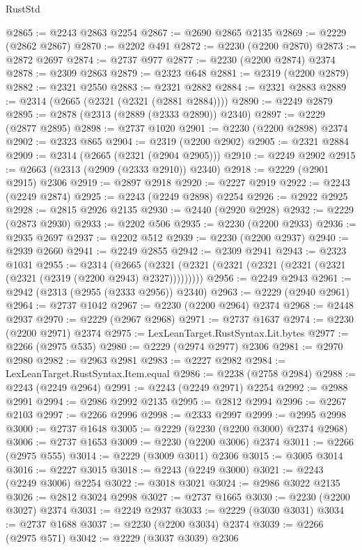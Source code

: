 \begin{lexlean}{RustStd}
\begin{coremodule}
@2865 := @2243 @2863 @2254
@2867 := @2690 @2865 @2135
@2869 := @2229 (@2862 @2867)
@2870 := @2202 @491
@2872 := @2230 (@2200 @2870)
@2873 := @2872 @2697
@2874 := @2737 @977
@2877 := @2230 (@2200 @2874) @2374
@2878 := @2309 @2863
@2879 := @2323 @648
@2881 := @2319 (@2200 @2879)
@2882 := @2321 @2550
@2883 := @2321 @2882
@2884 := @2321 @2883
@2889 := @2314 (@2665 (@2321 (@2321 (@2881 @2884))))
@2890 := @2249 @2879
@2895 := @2878 (@2313 (@2889 (@2333 @2890)) @2340)
@2897 := @2229 (@2877 @2895)
@2898 := @2737 @1020
@2901 := @2230 (@2200 @2898) @2374
@2902 := @2323 @865
@2904 := @2319 (@2200 @2902)
@2905 := @2321 @2884
@2909 := @2314 (@2665 (@2321 (@2904 @2905)))
@2910 := @2249 @2902
@2915 := @2663 (@2313 (@2909 (@2333 @2910)) @2340)
@2918 := @2229 (@2901 @2915) @2306
@2919 := @2897 @2918
@2920 := @2227 @2919
@2922 := @2243 (@2249 @2874)
@2925 := @2243 (@2249 @2898) @2254
@2926 := @2922 @2925
@2928 := @2815 @2926 @2135
@2930 := @2440 (@2920 @2928)
@2932 := @2229 (@2873 @2930)
@2933 := @2202 @506
@2935 := @2230 (@2200 @2933)
@2936 := @2935 @2697
@2937 := @2202 @512
@2939 := @2230 (@2200 @2937)
@2940 := @2939 @2660
@2941 := @2249 @2855
@2942 := @2309 @2941
@2943 := @2323 @1031
@2955 := @2314
    (@2665 (@2321 (@2321 (@2321 (@2321 (@2321 (@2321 (@2321 (@2319 (@2200 @2943) @2327)))))))))
@2956 := @2249 @2943
@2961 := @2942 (@2313 (@2955 (@2333 @2956)) @2340)
@2963 := @2229 (@2940 @2961)
@2964 := @2737 @1042
@2967 := @2230 (@2200 @2964) @2374
@2968 := @2448 @2937
@2970 := @2229 (@2967 @2968)
@2971 := @2737 @1637
@2974 := @2230 (@2200 @2971) @2374
@2975 := LexLeanTarget.RustSyntax.Lit.bytes
@2977 := @2266 (@2975 @535)
@2980 := @2229 (@2974 @2977) @2306
@2981 := @2970 @2980
@2982 := @2963 @2981
@2983 := @2227 @2982
@2984 := LexLeanTarget.RustSyntax.Item.equal
@2986 := @2238 (@2758 @2984)
@2988 := @2243 (@2249 @2964)
@2991 := @2243 (@2249 @2971) @2254
@2992 := @2988 @2991
@2994 := @2986 @2992 @2135
@2995 := @2812 @2994
@2996 := @2267 @2103
@2997 := @2266 @2996
@2998 := @2333 @2997
@2999 := @2995 @2998
@3000 := @2737 @1648
@3005 := @2229 (@2230 (@2200 @3000) @2374 @2968)
@3006 := @2737 @1653
@3009 := @2230 (@2200 @3006) @2374
@3011 := @2266 (@2975 @555)
@3014 := @2229 (@3009 @3011) @2306
@3015 := @3005 @3014
@3016 := @2227 @3015
@3018 := @2243 (@2249 @3000)
@3021 := @2243 (@2249 @3006) @2254
@3022 := @3018 @3021
@3024 := @2986 @3022 @2135
@3026 := @2812 @3024 @2998
@3027 := @2737 @1665
@3030 := @2230 (@2200 @3027) @2374
@3031 := @2249 @2937
@3033 := @2229 (@3030 @3031)
@3034 := @2737 @1688
@3037 := @2230 (@2200 @3034) @2374
@3039 := @2266 (@2975 @571)
@3042 := @2229 (@3037 @3039) @2306

\end{coremodule}
\end{lexlean}
